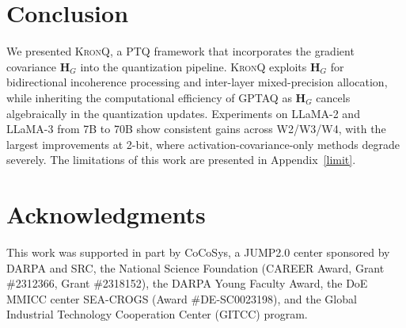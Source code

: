 \documentclass{article} %
\newcommand{\KronQ}{\textsc{KronQ}}
\begin{document}
\vspace{-3mm}
\section{Conclusion}
\vspace{-3mm}
We presented \KronQ{}, a PTQ framework that incorporates the gradient covariance $\mathbf{H}_G$ into the quantization pipeline. \KronQ{} exploits $\mathbf{H}_G$ for bidirectional incoherence processing and inter-layer mixed-precision allocation, while inheriting the computational efficiency of GPTAQ as $\mathbf{H}_G$ cancels algebraically in the quantization updates. Experiments on LLaMA-2 and LLaMA-3 from 7B to 70B show consistent gains across W2/W3/W4, with the largest improvements at 2-bit, where activation-covariance-only methods degrade severely. The limitations of this work are presented in Appendix~\ref{limit}.


\section*{Acknowledgments}

This work was supported in part by CoCoSys, a JUMP2.0 center sponsored by DARPA and SRC, the National Science Foundation (CAREER Award, Grant \#2312366, Grant \#2318152), the DARPA Young Faculty Award, the DoE MMICC center SEA-CROGS (Award \#DE-SC0023198), and the Global Industrial Technology Cooperation Center (GITCC) program.




\newpage
\appendix
\end{document}
